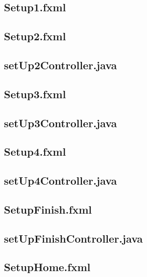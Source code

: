 \subsection*{Setup1.fxml}


\subsection*{Setup2.fxml}


\subsection*{setUp2Controller.java}


\subsection*{Setup3.fxml}


\subsection*{setUp3Controller.java}


\subsection*{Setup4.fxml}


\subsection*{setUp4Controller.java}


\subsection*{SetupFinish.fxml}


\subsection*{setUpFinishController.java}


\subsection*{SetupHome.fxml}



